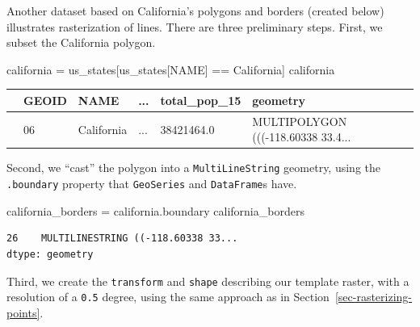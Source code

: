 \documentclass[
  letterpaper,
]{krantz}
\newenvironment{Shaded}{\begin{snugshade}}{\end{snugshade}}
\newcommand{\NormalTok}[1]{\textcolor[rgb]{0.00,0.23,0.31}{#1}}
\newcommand{\OperatorTok}[1]{\textcolor[rgb]{0.37,0.37,0.37}{#1}}
\newcommand{\StringTok}[1]{\textcolor[rgb]{0.13,0.47,0.30}{#1}}
\begin{document}
Another dataset based on California's polygons and borders (created
below) illustrates rasterization of lines. There are three preliminary
steps. First, we subset the California polygon.

\begin{Shaded}
\begin{Highlighting}[]
\NormalTok{california }\OperatorTok{=}\NormalTok{ us\_states[us\_states[}\StringTok{\textquotesingle{}NAME\textquotesingle{}}\NormalTok{] }\OperatorTok{==} \StringTok{\textquotesingle{}California\textquotesingle{}}\NormalTok{]}
\NormalTok{california}
\end{Highlighting}
\end{Shaded}

\begin{longtable}[]{@{}llllll@{}}
\toprule\noalign{}
& GEOID & NAME & ... & total\_pop\_15 & geometry \\
\midrule\noalign{}
\endhead
\bottomrule\noalign{}
\endlastfoot
26 & 06 & California & ... & 38421464.0 & MULTIPOLYGON (((-118.60338
33.4... \\
\end{longtable}

Second, we ``cast'' the polygon into a
\texttt{\textquotesingle{}MultiLineString\textquotesingle{}} geometry,
using the \texttt{.boundary} property that \texttt{GeoSeries} and
\texttt{DataFrame}s have.

\begin{Shaded}
\begin{Highlighting}[]
\NormalTok{california\_borders }\OperatorTok{=}\NormalTok{ california.boundary}
\NormalTok{california\_borders}
\end{Highlighting}
\end{Shaded}

\begin{verbatim}
26    MULTILINESTRING ((-118.60338 33...
dtype: geometry
\end{verbatim}

Third, we create the \texttt{transform} and \texttt{shape} describing
our template raster, with a resolution of a \texttt{0.5} degree, using
the same approach as in Section~\ref{sec-rasterizing-points}.
\end{document}
